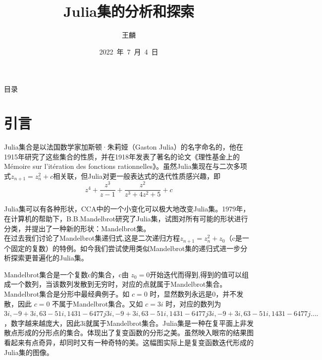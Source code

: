 \documentclass{ctexbeamer}
\begin{document}

\title{Julia集的分析和探索}
\author{王麟}
\date{2022~年~7~月~4~日}
\frame{\titlepage}



\begin{frame}{目录} 
\begin{center}        
  \tableofcontents[hideallsubsections]
  \end{center}
\end{frame}



\section{引言}    
\indent Julia集合是以法国数学家加斯顿·朱莉娅（Gaston Julia）的名字命名的，他在1915年研究了这些集合的性质，并在1918年发表了著名的论文《理性基金上的Mémoire sur l'itération des fonctions rationnelles》。虽然Julia集现在与二次多项式$z_{n+1}=z^2_n+c$相关联，但Julia对更一般表达式的迭代性质感兴趣，即
$$z^4+\frac{z^3}{z-1}+\frac{z^2}{z^3+4z^2+5}+c$$

Julia集可以有各种形状，CCA中的一个小变化可以极大地改变Julia集。1979年，在计算机的帮助下，B.B.Mandelbrot研究了Julia集，试图对所有可能的形状进行分类，并提出了一种新的形状：Mandelbrot集。\\
\indent 在过去我们讨论了Mandelbrot集递归式,这是二次递归方程$z_{n+1}=z^2_n+z_0$（c是一个固定的复数）的特例。如今我们尝试使用类似Mandelbrot集的递归式进一步分析探索更普遍化的Julia集。



\begin{frame}
\begin{center}
Mandelbrot集合是一个复数c的集合，c由  $z _0 = 0$开始迭代而得到,得到的值可以组成一个数列，当该数列发散到无穷时，对应的点就属于Mandelbrot集合。Mandelbrot集合是分形中最经典例子。如 $c = 0$ 时，显然数列永远是0，并不发散，因此 $c = 0$ 不属于Mandelbrot集合。又如 $c = 3 i $ 时，对应的数列为 $3 i , − 9 + 3 i , 63 − 51 i , 1431 − 6477 j 3i, -9+3i, 63-51i, 1431-6477j 3i,−9+3i,63−51i,1431−6477j …. $，数字越来越庞大，因此3i就属于Mandelbrot集合。Julia集是一种在复平面上非发散点形成的分形点的集合。体现出了复变函数的分形之美。虽然映入眼帘的结果图看起来有点奇异，却同时又有一种奇特的美。这幅图实际上是复变函数迭代形成的Julia集的图像。

\end{center}

\end{frame}
\end{document}
